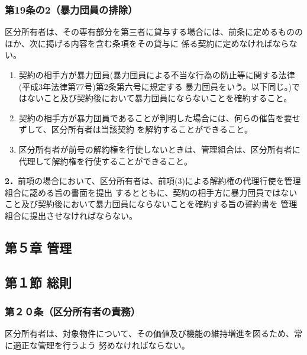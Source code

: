 \documentclass[
  luatex,
  paper=a4paper,
  fontsize=11pt,
  jafontsize=11pt,
  jlreq_notes,
]{jlreq}
\begin{document}
  \subsubsection*{第19条の2（暴力団員の排除）}
  区分所有者は、その専有部分を第三者に貸与する場合には、前条に定めるもののほか、次に掲げる内容を含む条項をその貸与に
  係る契約に定めなければならない。
  \begin{enumerate}
    \item 契約の相手方が暴力団員(暴力団員による不当な行為の防止等に関する法律(平成3年法律第77号)第2条第六号に規定する
    暴力団員をいう。以下同じ。)ではないこと及び契約後において暴力団員にならないことを確約すること。
    \item 契約の相手方が暴力団員であることが判明した場合には、何らの催告を要せずして、区分所有者は当該契約
    を解約することができること。
    \item 区分所有者が前号の解約権を行使しないときは、管理組合は、区分所有者に代理して解約権を行使することができること。
    \end{enumerate}
  \textbf{2．}前項の場合において、区分所有者は、前項(3)による解約権の代理行使を管理組合に認める旨の書面を提出
  するとともに、契約の相手方に暴力団員ではないこと及び契約後において暴力団員にならないことを確約する旨の誓約書を
  管理組合に提出させなければならない。\\
  
  \begin{center}
  \subsection*{第５章 管理}
  \subsection*{第１節 総則}
  \end{center}
  \subsubsection*{第２０条（区分所有者の責務）}
  区分所有者は、対象物件について、その価値及び機能の維持増進を図るため、常に適正な管理を行うよう
  努めなければならない。
\end{document}
